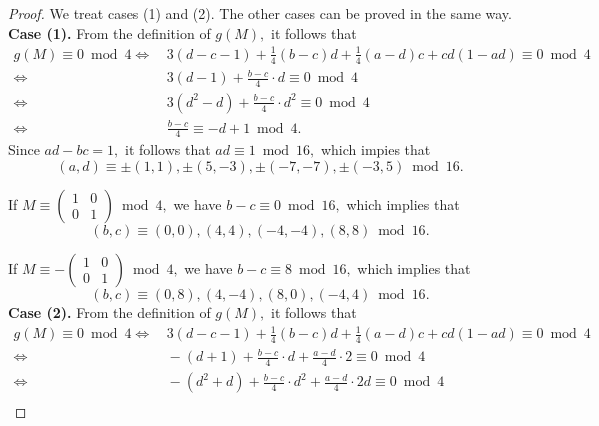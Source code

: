 \documentclass[12pt]{article}
\theoremstyle{definition}
\numberwithin{equation}{section}
\numberwithin{theorem}{section}
\begin{document}
\begin{proof}
We treat cases (1) and (2). The other cases can be proved in the same way. 
\newline
{\bf Case (1).}
From the definition of $g(M),$ it follows that 
\begin{align*}
g(M)\equiv 0 \bmod{4}
\Longleftrightarrow&\,  
3(d-c-1)+\frac14(b-c)d+\frac14(a-d)c+cd(1-ad)  \equiv 0 \bmod{4}  \\
\Longleftrightarrow& \,
3(d-1)+\frac{b-c}{4}\cdot d\equiv 0 \bmod{4} \\
\Longleftrightarrow& \,
3(d^2-d)+\frac{b-c}{4}\cdot d^2 \equiv 0 \bmod{4} \\
\Longleftrightarrow& \,
\frac{b-c}{4}\equiv -d+1  \bmod{4}. 
\end{align*}
Since $ad-bc=1,$ it follows that $ad\equiv 1 \bmod{16},$ 
which impies that 
\begin{equation*}
(a,d)\equiv 
\pm(1,1), \pm(5,-3), \pm(-7,-7), \pm(-3,5) \bmod{16}. 
\end{equation*}
\par
If 
$
M
\equiv 
\begin{pmatrix}
1 & 0 \\
0 & 1
\end{pmatrix}
\bmod{4}, 
$ we have 
$
\displaystyle
b-c \equiv 0 \bmod{16},
$ 
which implies that 
\begin{equation*}
(b,c)\equiv (0,0), (4,4), (-4,-4), (8,8) \bmod{16}.
\end{equation*}
\par
If 
$
M
\equiv 
-
\begin{pmatrix}
1 & 0 \\
0 & 1
\end{pmatrix}
\bmod{4}, 
$ we have 
$
\displaystyle
b-c \equiv 8 \bmod{16},
$ 
which implies that 
\begin{equation*}
(b,c)\equiv (0,8), (4,-4), (8,0), (-4,4) \bmod{16}.
\end{equation*}
\newline
{\bf Case (2).}
From the definition of $g(M),$ it follows that 
\begin{align*}
g(M)\equiv 0 \bmod{4}
\Longleftrightarrow&\,  
3(d-c-1)+\frac14(b-c)d+\frac14(a-d)c+cd(1-ad)  \equiv 0 \bmod{4}  \\
\Longleftrightarrow& \,
-(d+1)+\frac{b-c}{4}\cdot d  +\frac{a-d}{4}\cdot 2  \equiv 0 \bmod{4} \\
\Longleftrightarrow& \,
-(d^2+d)+\frac{b-c}{4}\cdot d^2  +\frac{a-d}{4}\cdot 2d  \equiv 0 \bmod{4} \\

\end{align*}
\end{proof}
\end{document}
